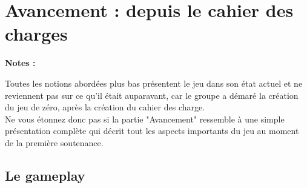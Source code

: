 \documentclass[a4paper]{article}
\begin{document}
\pagebreak

\section{Avancement : depuis le cahier des charges}

\textbf{Notes :}
\vspace{0.2 cm}

Toutes les notions abordées plus bas présentent le jeu dans son état actuel et ne reviennent pas sur ce qu'il était auparavant, car le groupe a démaré la création du jeu de zéro, après la création du cahier des charge.\\
Ne vous étonnez donc pas si la partie "Avancement" ressemble à une simple présentation complète qui décrit tout les aspects importants du jeu au moment de la première soutenance.
\\


\subsection{Le gameplay}
\vspace{0.5 cm}
\end{document}
